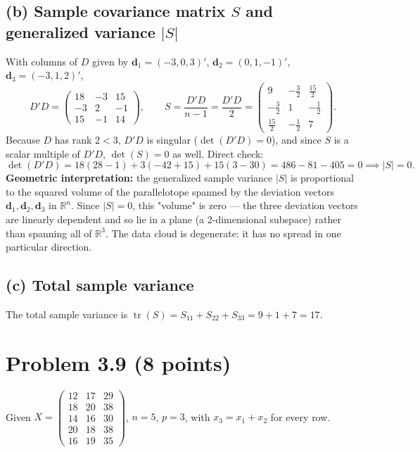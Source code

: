\documentclass[11pt]{article}
\begin{document}
\subsection*{(b) Sample covariance matrix $S$ and generalized variance $|S|$}
With columns of $D$ given by $\bm d_1=(-3,0,3)'$, $\bm d_2=(0,1,-1)'$, $\bm d_3=(-3,1,2)'$,
\[
D'D=\begin{pmatrix}18 & -3 & 15\\ -3 & 2 & -1\\ 15 & -1 & 14\end{pmatrix}, \qquad S=\frac{D'D}{n-1}=\frac{D'D}{2}=\begin{pmatrix}9 & -\tfrac32 & \tfrac{15}{2}\\[1mm] -\tfrac32 & 1 & -\tfrac12\\[1mm] \tfrac{15}{2} & -\tfrac12 & 7\end{pmatrix}.
\]
Because $D$ has rank $2<3$, $D'D$ is singular ($\det(D'D)=0$), and since $S$ is a scalar multiple of $D'D$, $\det(S)=0$ as well. Direct check:
\[
\det(D'D)=18(28-1)+3(-42+15)+15(3-30)=486-81-405=0 \implies |S|=0.
\]
\textbf{Geometric interpretation:} the generalized sample variance $|S|$ is proportional to the squared volume of the parallelotope spanned by the deviation vectors $\bm d_1,\bm d_2,\bm d_3$ in $\mathbb{R}^n$. Since $|S|=0$, this "volume" is zero — the three deviation vectors are linearly dependent and so lie in a plane (a 2-dimensional subspace) rather than spanning all of $\mathbb{R}^3$. The data cloud is degenerate: it has no spread in one particular direction.

\subsection*{(c) Total sample variance}
The total sample variance is $\operatorname{tr}(S)=S_{11}+S_{22}+S_{33}=9+1+7=17$.

\newpage
\section*{Problem 3.9 (8 points)}

\noindent Given $X=\begin{pmatrix}12&17&29\\18&20&38\\14&16&30\\20&18&38\\16&19&35\end{pmatrix}$, $n=5$, $p=3$, with $x_3=x_1+x_2$ for every row.
\end{document}
